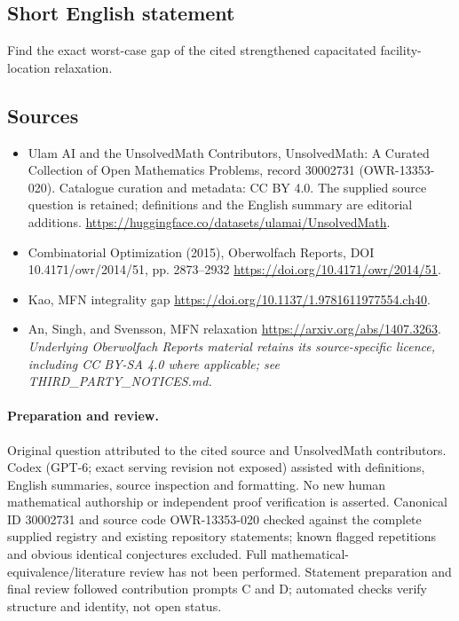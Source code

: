 \documentclass[11pt]{article}
\begin{document}
\subsection{Short English statement}
Find the exact worst-case gap of the cited strengthened capacitated facility-location relaxation.
\subsection{Sources}
\begin{itemize}
\item[\hypertarget{source:30002731:1}{S1}] Ulam AI and the UnsolvedMath Contributors, UnsolvedMath: A Curated Collection of Open Mathematics Problems, record 30002731 (OWR-13353-020). Catalogue curation and metadata: CC BY 4.0. The supplied source question is retained; definitions and the English summary are editorial additions.
\url{https://huggingface.co/datasets/ulamai/UnsolvedMath}.
\item[\hypertarget{source:30002731:2}{S2}] Combinatorial Optimization (2015), Oberwolfach Reports, DOI 10.4171/owr/2014/51, pp. 2873--2932
\url{https://doi.org/10.4171/owr/2014/51}.
\item[\hypertarget{source:30002731:3}{S3}] Kao, MFN integrality gap
\url{https://doi.org/10.1137/1.9781611977554.ch40}.
\item[\hypertarget{source:30002731:4}{S4}] An, Singh, and Svensson, MFN relaxation
\url{https://arxiv.org/abs/1407.3263}.
\textit{Underlying Oberwolfach Reports material retains its source-specific licence, including CC BY-SA 4.0 where applicable; see THIRD\_PARTY\_NOTICES.md.}
\end{itemize}
\paragraph{Preparation and review.}
Original question attributed to the cited source and UnsolvedMath contributors. Codex (GPT-6; exact serving revision not exposed) assisted with definitions, English summaries, source inspection and formatting. No new human mathematical authorship or independent proof verification is asserted. Canonical ID 30002731 and source code OWR-13353-020 checked against the complete supplied registry and existing repository statements; known flagged repetitions and obvious identical conjectures excluded. Full mathematical-equivalence/literature review has not been performed. Statement preparation and final review followed contribution prompts C and D; automated checks verify structure and identity, not open status.
\label{end:30002731}
\end{document}
